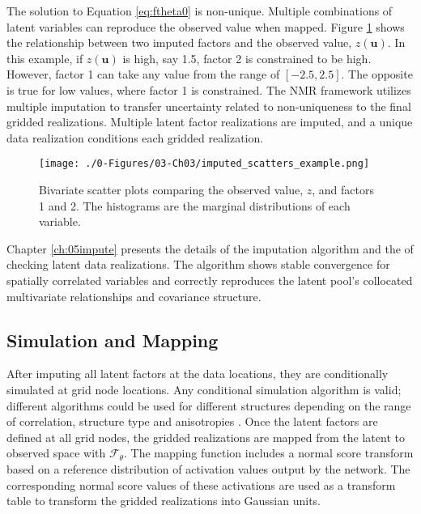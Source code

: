 The solution to Equation \ref{eq:ftheta0} is non-unique. Multiple combinations of latent variables can reproduce the observed value when mapped. Figure \ref{fig:imputed_scatters_example} shows the relationship between two imputed factors and the observed value, $z(\mathbf{u})$. In this example, if $z(\mathbf{u})$ is high, say 1.5, factor 2 is constrained to be high. However, factor 1 can take any value from the range of $[-2.5, 2.5]$. The opposite is true for low values, where factor 1 is constrained. The \gls{NMR} framework utilizes multiple imputation to transfer uncertainty related to non-uniqueness to the final gridded realizations. Multiple latent factor realizations are imputed, and a unique data realization conditions each gridded realization.

\begin{figure}[htb!]
    \centering
    \texttt{[image: ./0-Figures/03-Ch03/imputed\_scatters\_example.png]}
    \caption{Bivariate scatter plots comparing the observed value, $z$, and factors 1 and 2. The histograms are the marginal distributions of each variable. }
    \label{fig:imputed_scatters_example}
\end{figure}

Chapter \ref{ch:05impute} presents the details of the imputation algorithm and the of checking latent data realizations. The algorithm shows stable convergence for spatially correlated variables and correctly reproduces the latent pool's collocated multivariate relationships and covariance structure.

\FloatBarrier
\subsection{Simulation and Mapping}
\label{subsec:03simulate}

After imputing all latent factors at the data locations, they are conditionally simulated at grid node locations. Any conditional simulation algorithm is valid; different algorithms could be used for different structures depending on the range of correlation, structure type and anisotropies \citep{pinto2020independent}. Once the latent factors are defined at all grid nodes, the gridded realizations are mapped from the latent to observed space with $\mathcal{F}_{\theta}$. The mapping function includes a normal score transform based on a reference distribution of activation values output by the network. The corresponding normal score values of these activations are used as a transform table to transform the gridded realizations into Gaussian units.

